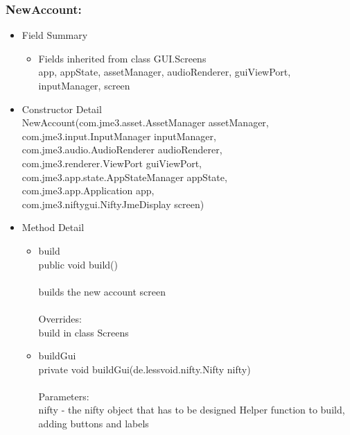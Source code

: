 \documentclass[letterpaper]{article}
\begin{document}
				\subsubsection*{NewAccount:}
				\vspace{0.1in}	
					\begin{itemize}
						\item	Field Summary
								\begin{itemize}
									\item	Fields inherited from class GUI.Screens \\
											app, appState, assetManager, audioRenderer, guiViewPort, inputManager, screen
								\end{itemize}
						\item	Constructor Detail \\
								NewAccount(com.jme3.asset.AssetManager assetManager, \\
         com.jme3.input.InputManager inputManager, \\
         com.jme3.audio.AudioRenderer audioRenderer, \\
         com.jme3.renderer.ViewPort guiViewPort, \\
         com.jme3.app.state.AppStateManager appState, \\
         com.jme3.app.Application app, \\
         com.jme3.niftygui.NiftyJmeDisplay screen)
						\item	Method Detail
								\begin{itemize}
									\item	build \\
											public void build() \\ \\
											builds the new account screen \\ \\
											Overrides: \\
											build in class Screens
									\item	buildGui \\
											private void buildGui(de.lessvoid.nifty.Nifty nifty) \\ \\
											Parameters: \\
											nifty - the nifty object that has to be designed Helper function to build, adding buttons and labels
								\end{itemize}
					\end{itemize}
				\newpage
\end{document}

